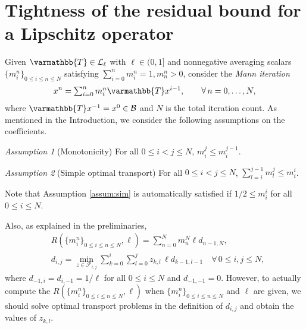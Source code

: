 \documentclass[pdflatex,sn-mathphys-num]{sn-jnl}%
\newcommand{\cB}{\mathcal{B}}
\newcommand{\cL}{\mathcal{L}}
\newcommand{\opT}{{\varmathbb{T}}}
\theoremstyle{thmstyleone}%
\theoremstyle{thmstyletwo}%
\theoremstyle{thmstylethree}%
\newtheorem*{assumone}{Assumption 1}
\newtheorem*{assumtwo}{Assumption 2}
\begin{document}
\section{Tightness of the residual bound for a Lipschitz operator }\label{sec:2}
Given  $\opT\in \cL_\ell$ with $\ell \in(0,1]$ and nonnegative averaging scalars 
$\{m^n_i\}_{0 \le i \le n \le N}$ satisfying $\sum^n_{i=0}m^n_i=1, m^n_n>0$,
consider the \emph{Mann iteration} 
 \[x^{n} = \mbox{$\sum^{n}_{i=0}  m^n_i\opT x^{i-1}$},    \qquad\forall\, n=0,\dots,N, \]
where $\opT x^{-1}=x^0 \in \cB$ and $N$ is the total iteration count. As mentioned in the Introduction, we consider the following assumptions on the coefficients.

\vspace{0.2in}

\noindent\textit{Assumption 1} (Monotonicity) For all $0 \le i < j \le N$, $m^j_i \le m^{j-1}_i$.

\vspace{0.1in}

\noindent\textit{Assumption 2} (Simple optimal transport) For all $0 \le i < j \le N$, $\sum^{j-1}_{l=i}m^j_l \le m^i_i$.

\vspace{0.2in}

Note that Assumption \ref{assum:sim} is automatically satisfied if $1/2 \le m^i_i$ for all $0 \le i \le N$.




Also, as explained in the preliminaries,
\begin{align*}
  &R(\{m^n_i\}_{0 \le i \le n \le N}, \ell ) = \sum^N_{n=0} m^N_n \ell d_{n-1,N},\\
  &d_{i,j} =\min_{z \in \mathcal{F}_{i,j}}\sum^i_{k=0}\sum^j_{l=0}  z_{k,l}\, \ell d_{k-1,l-1} \quad \forall\, 0\le i,j\le N,
\end{align*} 
where $d_{-1,i}=d_{i,-1}=1/\ell$ for all $0 \le i\le N$ and $d_{-1,-1}=0$. However, to actually compute the $R(\{m^n_i\}_{0 \le i \le n \le N}, \ell ) $ when $\{m^n_i\}_{0 \le i \le n \le N}$ and $\ell$ are given, we should solve optimal transport problems in the definition of $d_{i,j}$ and obtain the values of $z_{k,l}$.  
\end{document}

